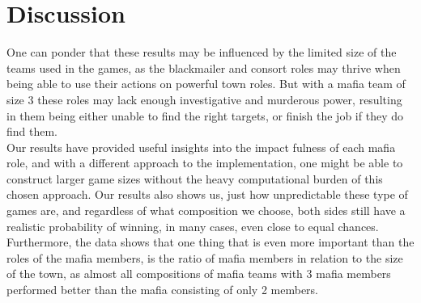 \section{Discussion}\label{sec:discussion}
One can ponder that these results may be influenced by the limited size of the
teams used in the games, as the blackmailer and consort roles may thrive when
being able to use their actions on powerful town roles. But with a mafia team
of size 3 these roles may lack enough investigative and murderous power,
resulting in them being either unable to find the right targets, or finish the
job if they do find them.\\ Our results have provided useful insights into the
impact fulness of each mafia role, and with a different approach to the
implementation, one might be able to construct larger game sizes without the
heavy computational burden of this chosen approach. Our results also shows us,
just how unpredictable these type of games are, and regardless of what
composition we choose, both sides still have a realistic probability of
winning, in many cases, even close to equal chances.\\ Furthermore, the data
shows that one thing that is even more important than the roles of the mafia
members, is the ratio of mafia members in relation to the size of the town, as
almost all compositions of mafia teams with 3 mafia members performed better
than the mafia consisting of only 2 members.